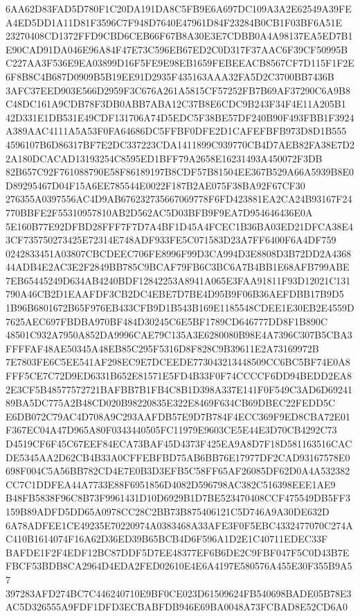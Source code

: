 \documentclass[UTF8,fontset=fandol,zihao=-4,a4paper]{ctexart}
\begin{document}
{{6AA62D83FAD5D780F1C20DA191DA8C5FB9E6A697DC109A3A2E62549A39FEA4ED5DD1A11D81F3596C7F948D7640E47961D84F23284B0CB1F03BF6A51E
23270408CD1372FFD9CBD6CEB66F67B8A30E3E7CDBB0A4A98137EA5ED7B1E90CAD91DA046E96A84F47E73C596EB67ED2C0D317F37AAC6F39CF50995B
C227AA3F536E9EA03899D16F5FE9E98EB1659FEBEEACB8567CF7D115F1F2E6F8B8C4B687D0909B5B19EE91D2935F435163AAA32FA5D2C3700BB7436B
3AFC37EED903E566D2959F3C676A261A5815CF57252FB7B69AF37290C6A9B8C48DC161A9CDB78F3DB0ABB7ABA12C37B8E6CDC9B243F34F4E11A205B1
42D331E1DB531E49CDF131706A74D5EDC5F38BE57DF240B90F493FBB1F3924A389AAC4111A5A53F0FA64686DC5FFBF0DFE2D1CAFEFBFB973D8D1B555
4596107B6D86317BF7E2DC337223CDA1411899C939770CB4D7AEB82FA38E7D22A180DCACAD13193254C8595ED1BFF79A2658E16231493A450072F3DB
82B657C92F761088790E58F86189197B8CDF57B81504EE367B529A66A5939B8E0D89295467D04F15A6EE785544E0022F187B2AE075F38BA92F67CF30
276355A0397556AC4D9AB676232735667069778F6FD423881EA2CA24B93167F24770BBFE2F55310957810AB2D562AC5D03BFB9F9EA7D954646436E0A
5E160B77E92DFBD28FFF7F7D7A4BF1D45A4FCEC1B36BA03ED21DFCA38E43CF735750273425E72314E748ADF933FE5C071583D23A7FF6400F6A4DF759
0242833451A03807CBCDEEC706FE8996F99D3CA994D3E8808D3B72DD2A436844ADB4E2AC3E2F2849BB785C9BCAF79FB6C3BC6A7B4BB1E68AFB799ABE
7EB65445249D634AB4240BDF12842253A8941A065E3FAA91811F93D12021C131790A46CB2D1EAAFDF3CB2DC4EBE7D7BE4D95B9F06B36AEFDBB17B9D5
1B96B6801672B65F976EB433CFB9D1B543B169E1185548CDEE1E30EB2E4559D7625AEC697FBDBA970BF484D30245C6E5BF1789CD646777DD8F1B890C
48501C932A7950A852DA9996CAE79C135A3E6280080B98E4A7396C307B5CBA3FFFFAF48AE50345A48EB85C295F5316D8F828C9B39611E2A73169972B
7E7803FE6C5EE541AF298EC9E7DCEEDE773043213448509CC6BC5BF74E0A8FFF5CE7C72D9ED6331B652E81571E5FD4B33F0F74CCCCF6DD94BEDD2EA8
2E3CF5B48577572721BAFBB7B1FB4C8B1D398A337E141F0F549C3AD6D6924189BA5DC775A2B48CD020B98220835E322E8469F634CB69DBEC22FEDD5C
E6DB072C79AC4D708A9C293AAFDB57E9D7B784F4ECC369F9ED8CBA72E01F367EC04A47D965A80F0343440505FC11979E9603CE5E44E3D70CB4292C73
D4519CF6F45C67EEF84ECA73BAF45D4373F425EA9A8D7F18D581163516CACDE5345AA2D62CB4B33A0CFFEBFBD75AB6BB76E17977DF2CAD93167578E0
698F004C5A56BB782CD4E7E0B3D3EFB5C58FF65AF26085DF62D0A4A532382CC7C1DDFEA44A7733E88F6951856D4082D596798AC382C516398EEE1AE9
B48FB5838F96C8B73F9961431D10D6929B1D7BE523470408CCF475549DB5FF3159B89ADFD5DD65A0978CC28C2BB73B875406121C5D746A9A30DE632D
6A78ADFEE1CE49235E70220974A0383468A33AFE3F0F5EBC4332477070C274AC410B1614074F16A62D36ED39B65BCB4D6F596A1D2E1C40711EDEC33F
BAFDE1F2F4EDF12BC87DDF5D7EE48377EF6B6DE2C9FBF047F5C0D43B7EFBCF53BDB8CA2964D4EDA2FED02610E4E6A4197E580576A455E30F355B9A57
397283AFD274BC7C446240710E9BF0CE023D61509624FB540698BADE05B78E3AC5D326555A9FDF1DFD3ECBABFDB946E69BA0048A73FCBAD8E52CD6A0
}}
\end{document}
